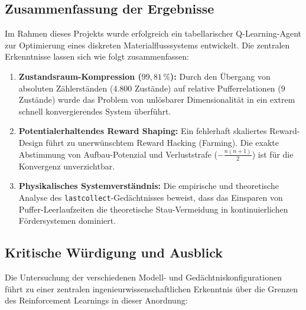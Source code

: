 \documentclass[11pt,a4paper]{article}
\begin{document}
\subsection{Zusammenfassung der Ergebnisse}
Im Rahmen dieses Projekts wurde erfolgreich ein tabellarischer Q-Learning-Agent zur Optimierung eines diskreten Materialflusssystems entwickelt. Die zentralen Erkenntnisse lassen sich wie folgt zusammenfassen:
\begin{enumerate}
  \item \textbf{Zustandsraum-Kompression ($99{,}81\,\%$):} Durch den Übergang von absoluten Zählerständen ($4.800$ Zustände) auf relative Pufferrelationen ($9$ Zustände) wurde das Problem von unlösbarer Dimensionalität in ein extrem schnell konvergierendes System überführt.
  \item \textbf{Potentialerhaltendes Reward Shaping:} Ein fehlerhaft skaliertes Reward-Design führt zu unerwünschtem Reward Hacking (Farming). Die exakte Abstimmung von Aufbau-Potenzial und Verluststrafe ($-\frac{n(n+1)}{2}$) ist für die Konvergenz unverzichtbar.
  \item \textbf{Physikalisches Systemverständnis:} Die empirische und theoretische Analyse des \texttt{lastcollect}-Gedächtnisses beweist, dass das Einsparen von Puffer-Leerlaufzeiten die theoretische Stau-Vermeidung in kontinuierlichen Fördersystemen dominiert.
\end{enumerate}

\subsection{Kritische Würdigung und Ausblick}
Die Untersuchung der verschiedenen Modell- und Gedächtniskonfigurationen führt zu einer zentralen ingenieurwissenschaftlichen Erkenntnis über die Grenzen des Reinforcement Learnings in dieser Anordnung:
\end{document}
